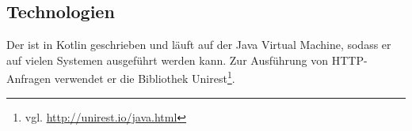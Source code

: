 \subsection{Technologien}
    Der {\wordpressCrawler} ist in Kotlin geschrieben und läuft auf der Java Virtual Machine,
    sodass er auf vielen Systemen ausgeführt werden kann.
    Zur Ausführung von HTTP-Anfragen verwendet er die Bibliothek
    Unirest\footnote{vgl. \url{http://unirest.io/java.html}}.